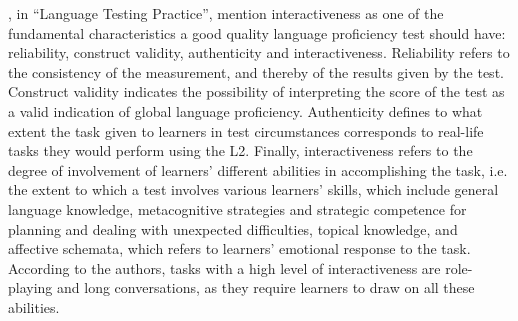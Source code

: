 \citet{BachmanPalmer1996}, in “Language Testing Practice”, mention interactiveness as one of the fundamental characteristics a good quality language proficiency test should have: reliability, construct validity, authenticity and interactiveness. Reliability refers to the consistency of the measurement, and thereby of the results given by the test. Construct validity indicates the possibility of interpreting the score of the test as a valid indication of global language proficiency. Authenticity defines to what extent the task given to learners in test circumstances corresponds to real-life tasks they would perform using the L2. Finally, interactiveness refers to the degree of involvement of learners’ different abilities in accomplishing the task, i.e. the extent to which a test involves various learners’ skills, which include general language knowledge, metacognitive strategies and strategic competence for planning and dealing with unexpected difficulties, topical knowledge, and affective schemata, which refers to learners’ emotional response to the task. According to the authors, tasks with a high level of interactiveness are role-playing and long conversations, as they require learners to draw on all these abilities.

